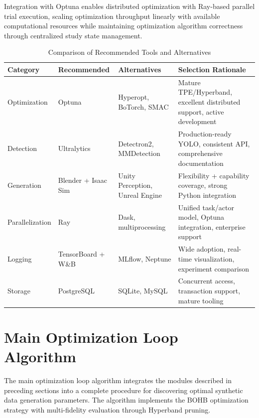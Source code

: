 Integration with Optuna enables distributed optimization with Ray-based parallel trial execution, scaling optimization throughput linearly with available computational resources while maintaining optimization algorithm correctness through centralized study state management.

\begin{table}[htbp]
\centering
\caption{Comparison of Recommended Tools and Alternatives}
\label{tab:tool_comparison}
\begin{tabular}{p{2.5cm}p{3.5cm}p{3.5cm}p{4cm}}
\toprule
\textbf{Category} & \textbf{Recommended} & \textbf{Alternatives} & \textbf{Selection Rationale} \\
\midrule
Optimization & Optuna & Hyperopt, BoTorch, SMAC & Mature TPE/Hyperband, excellent distributed support, active development \\
\addlinespace
Detection & Ultralytics & Detectron2, MMDetection & Production-ready YOLO, consistent API, comprehensive documentation \\
\addlinespace
Generation & Blender + Isaac Sim & Unity Perception, Unreal Engine & Flexibility + capability coverage, strong Python integration \\
\addlinespace
Parallelization & Ray & Dask, multiprocessing & Unified task/actor model, Optuna integration, enterprise support \\
\addlinespace
Logging & TensorBoard + W\&B & MLflow, Neptune & Wide adoption, real-time visualization, experiment comparison \\
\addlinespace
Storage & PostgreSQL & SQLite, MySQL & Concurrent access, transaction support, mature tooling \\
\bottomrule
\end{tabular}
\end{table}

\section{Main Optimization Loop Algorithm}
\label{sec:main_algorithm}

The main optimization loop algorithm integrates the modules described in preceding sections into a complete procedure for discovering optimal synthetic data generation parameters. The algorithm implements the BOHB optimization strategy with multi-fidelity evaluation through Hyperband pruning.


